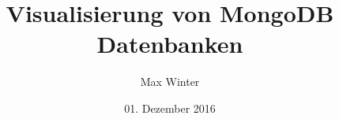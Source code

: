 \documentclass[oneside]{ausarbeitung}
\begin{document}


\Projektbericht

\Informatik

\title{Visualisierung von MongoDB Datenbanken}

\author{Max Winter}

\examinerIsAProfessortrue   %


\date{01. Dezember 2016}



\maketitle
\cleardoublepage

\setcounter{page}{1}


\makeaffirmation
\cleardoublepage


\cleardoublepage
\tableofcontents

\listoffigures

\listoftables

\lstlistoflistings
\end{document}
